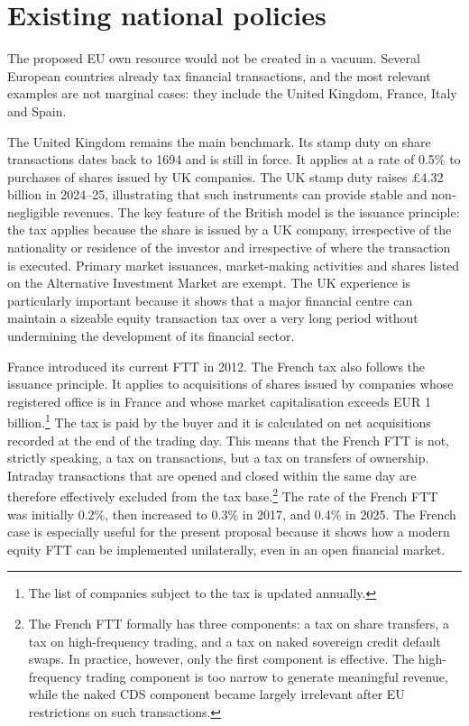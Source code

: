 \documentclass[../../main]{subfiles}
\begin{document}
\section{Existing national policies}
\label{sec:national_policies}

The proposed EU own resource would not be created in a vacuum. Several European countries already tax financial transactions, and the most relevant examples are not marginal cases: they include the United Kingdom, France, Italy and Spain. 

The United Kingdom remains the main benchmark. Its stamp duty on share transactions dates back to 1694 and is still in force. It applies at a rate of 0.5\% to purchases of shares issued by UK companies. The UK stamp duty raises \pounds{}4.32 billion in 2024--25, illustrating that such instruments can provide stable and non-negligible revenues. The key feature of the British model is the issuance principle: the tax applies because the share is issued by a UK company, irrespective of the nationality or residence of the investor and irrespective of where the transaction is executed. Primary market issuances, market-making activities and shares listed on the Alternative Investment Market are exempt. The UK experience is particularly important because it shows that a major financial centre can maintain a sizeable equity transaction tax over a very long period without undermining the development of its financial sector.

France introduced its current FTT in 2012. The French tax also follows the issuance principle. It applies to acquisitions of shares issued by companies whose registered office is in France and whose market capitalisation exceeds EUR 1 billion.\footnote{The list of companies subject to the tax is updated annually.} The tax is paid by the buyer and it is calculated on net acquisitions recorded at the end of the trading day. This means that the French FTT is not, strictly speaking, a tax on transactions, but a tax on transfers of ownership. Intraday transactions that are opened and closed within the same day are therefore effectively excluded from the tax base.\footnote{The French FTT formally has three components: a tax on share transfers, a tax on high-frequency trading, and a tax on naked sovereign credit default swaps. In practice, however, only the first component is effective. The high-frequency trading component is too narrow to generate meaningful revenue, while the naked CDS component became largely irrelevant after EU restrictions on such transactions.} The rate of the French FTT was initially 0.2\%, then increased to 0.3\% in 2017, and 0.4\% in 2025. The French case is especially useful for the present proposal because it shows how a modern equity FTT can be implemented unilaterally, even in an open financial market.
\end{document}
